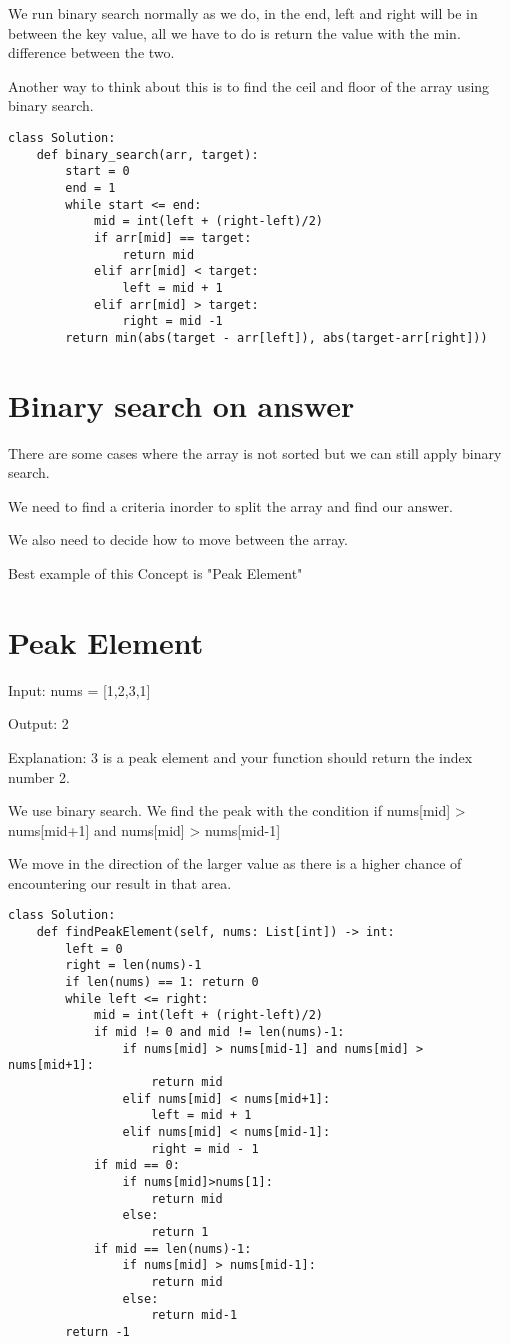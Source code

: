 \documentclass[24pt, a4]{article}
\begin{document}
We run binary search normally as we do, in the end, left and right will be 
in between the key value, all we have to do is return the value with the min.
difference between the two.

Another way to think about this is to find the ceil and floor of the array
using binary search.

\begin{lstlisting}
class Solution:
    def binary_search(arr, target):
        start = 0
        end = 1
        while start <= end:
            mid = int(left + (right-left)/2)
            if arr[mid] == target:
                return mid
            elif arr[mid] < target:
                left = mid + 1
            elif arr[mid] > target:
                right = mid -1
        return min(abs(target - arr[left]), abs(target-arr[right]))
\end{lstlisting}

\section{Binary search on answer}

There are some cases where the array is not sorted but we can still apply
binary search.

We need to find a criteria inorder to split the array and find our answer.

We also need to decide how to move between the array.

Best example of this Concept is "Peak Element"

\newpage
\section{Peak Element}
Input: nums = [1,2,3,1]

Output: 2

Explanation: 3 is a peak element and your function should return the 
index number 2.

We use binary search. We find the peak with the condition 
if nums[mid] > nums[mid+1] and nums[mid] > nums[mid-1]

We move in the direction of the larger value as there is a higher chance
of encountering our result in that area.

\begin{lstlisting}
class Solution:
    def findPeakElement(self, nums: List[int]) -> int:
        left = 0
        right = len(nums)-1
        if len(nums) == 1: return 0
        while left <= right:
            mid = int(left + (right-left)/2)
            if mid != 0 and mid != len(nums)-1:
                if nums[mid] > nums[mid-1] and nums[mid] > nums[mid+1]:
                    return mid
                elif nums[mid] < nums[mid+1]:
                    left = mid + 1
                elif nums[mid] < nums[mid-1]:
                    right = mid - 1
            if mid == 0:
                if nums[mid]>nums[1]:
                    return mid
                else:
                    return 1
            if mid == len(nums)-1:
                if nums[mid] > nums[mid-1]:
                    return mid
                else:
                    return mid-1
        return -1 
\end{lstlisting}
\end{document}
